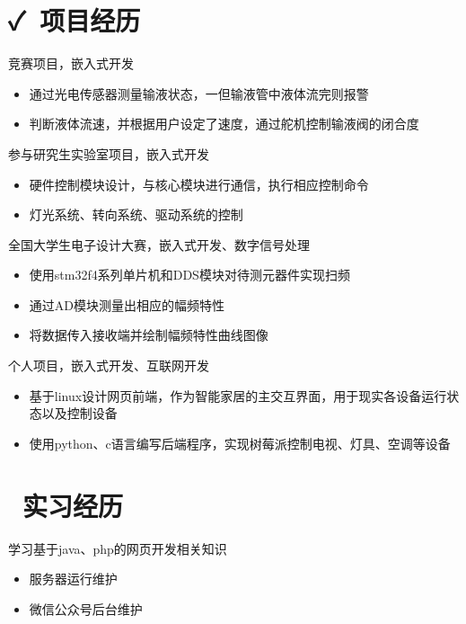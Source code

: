\documentclass{resume}
\begin{document}
\section{\faCheck\ 项目经历}
\begin{onehalfspacing}
竞赛项目，嵌入式开发
\begin{itemize}
  \item 通过光电传感器测量输液状态，一但输液管中液体流完则报警
  \item 判断液体流速，并根据用户设定了速度，通过舵机控制输液阀的闭合度
\end{itemize}
\end{onehalfspacing}
\begin{onehalfspacing}
参与研究生实验室项目，嵌入式开发
\begin{itemize}
  \item 硬件控制模块设计，与核心模块进行通信，执行相应控制命令
  \item 灯光系统、转向系统、驱动系统的控制
\end{itemize}
\end{onehalfspacing}
\begin{onehalfspacing}
全国大学生电子设计大赛，嵌入式开发、数字信号处理
\begin{itemize}
  \item 使用stm32f4系列单片机和DDS模块对待测元器件实现扫频
  \item 通过AD模块测量出相应的幅频特性
  \item 将数据传入接收端并绘制幅频特性曲线图像
\end{itemize}
\end{onehalfspacing}
\begin{onehalfspacing}
个人项目，嵌入式开发、互联网开发
\begin{itemize}
  \item 基于linux设计网页前端，作为智能家居的主交互界面，用于现实各设备运行状态以及控制设备
  \item 使用python、c语言编写后端程序，实现树莓派控制电视、灯具、空调等设备
\end{itemize}
\end{onehalfspacing}



\section{\faFile\ 实习经历}
\begin{onehalfspacing}
学习基于java、php的网页开发相关知识
\begin{itemize}
  \item 服务器运行维护
  \item 微信公众号后台维护
\end{itemize}
\end{onehalfspacing}
\end{document}
